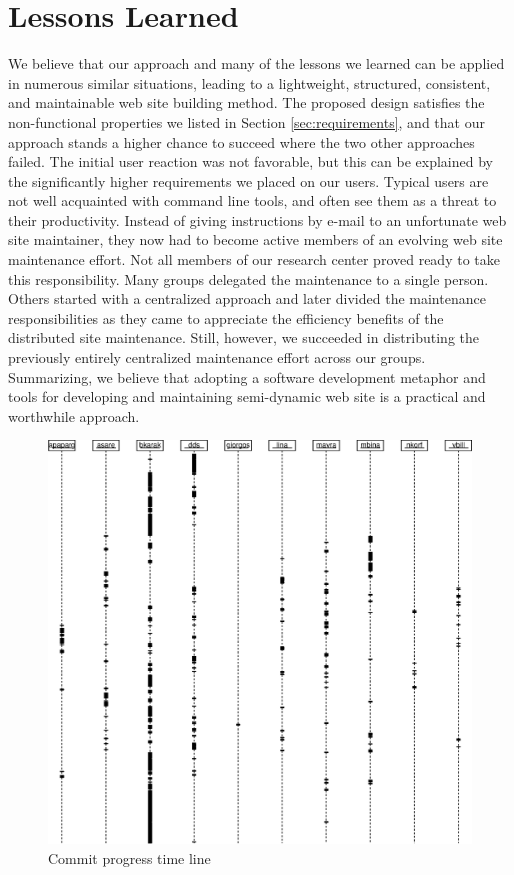 \documentclass{elsart}
\begin{document}
\section{Lessons Learned}
\label{sec:concl}

We believe that our approach and many of the lessons we learned
can be applied in numerous similar situations,
leading to a lightweight, structured, consistent, and maintainable
web site building method. The proposed design satisfies the non-functional properties
we listed in Section \ref{sec:requirements},
and that our approach stands a higher chance to succeed where the
two other approaches failed.
The initial user reaction was not favorable, but this can
be explained by the significantly higher requirements we
placed on our users. Typical users are not well acquainted
with command line tools, and often see them as a threat to their productivity.
Instead of giving instructions by e-mail to an unfortunate
web site maintainer, they now had to become active members
of an evolving web site maintenance effort.
Not all members of our research center proved ready to take
this responsibility.
Many groups delegated the maintenance to a single person. 
Others started with a centralized approach and later divided the
maintenance responsibilities as they came to appreciate the efficiency
benefits of the distributed site maintenance.
Still, however, we succeeded in distributing the previously
entirely centralized maintenance effort across our groups.
Summarizing, we believe that adopting a software development
metaphor and tools for developing and maintaining semi-dynamic
web site is a practical and worthwhile approach.

\begin{figure}[h!]
\includegraphics[scale=0.6]{cvs-log.eps}
\caption{Commit progress time line}
\label{fig:cvs-log}
\end{figure}
\end{document}
